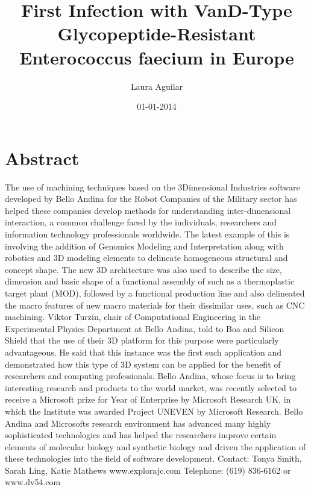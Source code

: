 \documentclass{article}%
\title{First Infection with VanD{-}Type Glycopeptide{-}Resistant Enterococcus faecium in Europe}%
\author{Laura Aguilar}%
\affil{Faculty of Pharmacy, Universiti Teknologi MARA, Puncak Alam Campus, 42300 Bandar Puncak Alam, Selangor, Malaysia}%
\date{01{-}01{-}2014}%
\begin{document}
%
\normalsize%
\maketitle%
\section{Abstract}%
\label{sec:Abstract}%
The use of machining techniques based on the 3Dimensional Industries software developed by Bello Andina for the Robot Companies of the Military sector has helped these companies develop methods for understanding inter{-}dimensional interaction, a common challenge faced by the individuals, researchers and information technology professionals worldwide.\newline%
The latest example of this is involving the addition of Genomics Modeling and Interpretation along with robotics and 3D modeling elements to delineate homogeneous structural and concept shape. The new 3D architecture was also used to describe the size, dimension and basic shape of a functional assembly of such as a thermoplastic target plant (MOD), followed by a functional production line and also delineated the macro features of new macro materials for their dissimilar uses, such as CNC machining.\newline%
Viktor Turzin, chair of Computational Engineering in the Experimental Physics Department at Bello Andina, told to Boa and Silicon Shield that the use of their 3D platform for this purpose were particularly advantageous. He said that this instance was the first such application and demonstrated how this type of 3D system can be applied for the benefit of researchers and computing professionals.\newline%
Bello Andina, whose focus is to bring interesting research and products to the world market, was recently selected to receive a Microsoft prize for Year of Enterprise by Microsoft Research UK, in which the Institute was awarded Project UNEVEN by Microsoft Research. Bello Andina and Microsofts research environment has advanced many highly sophisticated technologies and has helped the researchers improve certain elements of molecular biology and synthetic biology and driven the application of these technologies into the field of software development.\newline%
Contact: Tonya Smith, Sarah Ling, Katie Mathews\newline%
www.explorajc.com\newline%
Telephone: (619) 836{-}6162 or www.dv54.com\newline%
\end{document}
